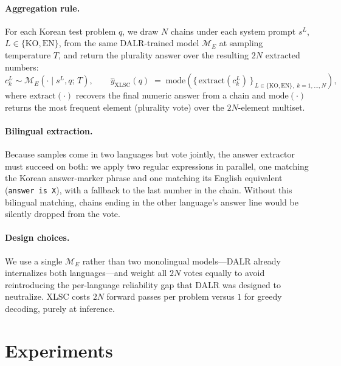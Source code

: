 \documentclass{article}
\begin{document}
\paragraph{Aggregation rule.}
For each Korean test problem $q$, we draw $N$ chains under each
system prompt $s^L$, $L \in \{\mathrm{KO}, \mathrm{EN}\}$, from the
same DALR-trained model $\mathcal{M}_E$ at sampling temperature $T$,
and return the plurality answer over the resulting $2N$ extracted
numbers:
\begin{equation}
  c^L_k \sim \mathcal{M}_E(\cdot \mid s^L, q;\, T),
  \qquad
  \hat{y}_{\mathrm{XLSC}}(q) \;=\;
  \mathrm{mode}\!\left(
    \{\,\mathrm{extract}(c^L_k)\,\}_{\,L \in \{\mathrm{KO}, \mathrm{EN}\},\; k = 1,\dots,N}
  \right),
\end{equation}
where $\mathrm{extract}(\cdot)$ recovers the final numeric answer
from a chain and $\mathrm{mode}(\cdot)$ returns the most frequent
element (plurality vote) over the $2N$-element multiset.

\paragraph{Bilingual extraction.}
Because samples come in two languages but vote jointly, the answer
extractor must succeed on both: we apply two regular expressions in
parallel, one matching the Korean answer-marker phrase and one
matching its English equivalent (\texttt{answer is X}), with a
fallback to the last number in the chain. Without this bilingual
matching, chains ending in the other language's answer line would be
silently dropped from the vote.

\paragraph{Design choices.}
We use a single $\mathcal{M}_E$ rather than two monolingual
models---DALR already internalizes both languages---and weight all
$2N$ votes equally to avoid reintroducing the per-language reliability
gap that DALR was designed to neutralize. XLSC costs $2N$ forward
passes per problem versus $1$ for greedy decoding, purely at
inference.

\section{Experiments}
\end{document}
